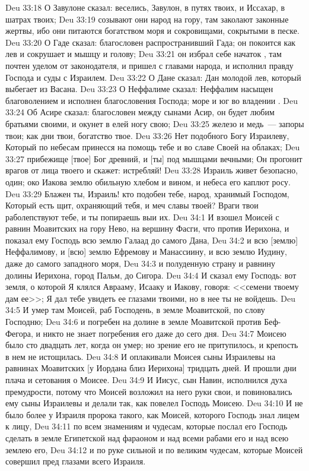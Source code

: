 \vs Deu 33:18 О Завулоне сказал: веселись, Завулон, в путях твоих, и Иссахар, в шатрах твоих;
\vs Deu 33:19 созывают они народ на гору, там заколают законные жертвы, ибо они питаются богатством моря и сокровищами, сокрытыми в песке.
\vs Deu 33:20 О Гаде сказал: благословен распространивший Гада; он покоится как лев и сокрушает и мышцу и голову;
\vs Deu 33:21 он избрал себе начаток , там почтен уделом от законодателя, и пришел с главами народа, и исполнил правду Господа и суды с Израилем.
\vs Deu 33:22 О Дане сказал: Дан молодой лев, который выбегает из Васана.
\vs Deu 33:23 О Неффалиме сказал: Неффалим насыщен благоволением и исполнен благословения Господа; море и юг во владении .
\vs Deu 33:24 Об Асире сказал: благословен между сынами Асир, он будет любим братьями своими, и окунет в елей ногу свою;
\vs Deu 33:25 железо и медь~--- запоры твои; как дни твои,  богатство твое.
\vs Deu 33:26 Нет подобного Богу Израилеву, Который по небесам принесся на помощь тебе и во славе Своей на облаках;
\vs Deu 33:27 прибежище [твое] Бог древний, и [ты] под мышцами вечными; Он прогонит врагов от лица твоего и скажет: истребляй!
\vs Deu 33:28 Израиль живет безопасно, один; око Иакова  землю обильную хлебом и вином, и небеса его каплют росу.
\vs Deu 33:29 Блажен ты, Израиль! кто подобен тебе, народ, хранимый Господом, Который есть щит, охраняющий тебя, и меч славы твоей? Враги твои раболепствуют тебе, и ты попираешь выи их.
\vs Deu 34:1 И взошел Моисей с равнин Моавитских на гору Нево, на вершину Фасги, что против Иерихона, и показал ему Господь всю землю Галаад до самого Дана,
\vs Deu 34:2 и всю [землю] Неффалимову, и [всю] землю Ефремову и Манассиину, и всю землю Иудину, даже до самого западного моря,
\vs Deu 34:3 и полуденную страну и равнину долины Иерихона, город Пальм, до Сигора.
\vs Deu 34:4 И сказал ему Господь: вот земля, о которой Я клялся Аврааму, Исааку и Иакову, говоря: <<семени твоему дам ее>>; Я дал тебе увидеть ее глазами твоими, но в нее ты не войдешь.
\rsbpar\vs Deu 34:5 И умер там Моисей, раб Господень, в земле Моавитской, по слову Господню;
\vs Deu 34:6 и погребен на долине в земле Моавитской против Беф-Фегора, и никто не знает  погребения его даже до сего дня.
\vs Deu 34:7 Моисею было сто двадцать лет, когда он умер; но зрение его не притупилось, и крепость в нем не истощилась.
\vs Deu 34:8 И оплакивали Моисея сыны Израилевы на равнинах Моавитских [у Иордана близ Иерихона] тридцать дней. И прошли дни плача и сетования о Моисее.
\vs Deu 34:9 И Иисус, сын Навин, исполнился духа премудрости, потому что Моисей возложил на него руки свои, и повиновались ему сыны Израилевы и делали так, как повелел Господь Моисею.
\vs Deu 34:10 И не было более у Израиля пророка такого, как Моисей, которого Господь знал лицем к лицу,
\vs Deu 34:11 по всем знамениям и чудесам, которые послал его Господь сделать в земле Египетской над фараоном и над всеми рабами его и над всею землею его,
\vs Deu 34:12 и по руке сильной и по великим чудесам, которые Моисей совершил пред глазами всего Израиля.

